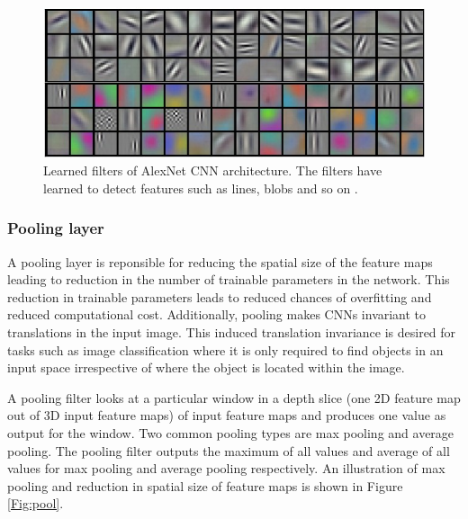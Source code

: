 	\begin{figure}[h]
		\centering
		\includegraphics[width=.8\linewidth]{images/conv_template}
		\caption{Learned filters of AlexNet CNN architecture. The filters have learned to detect features such as lines, blobs and so on \cite{cs231n}.}
		\label{Fig:conv_template}
	\end{figure}
	

\subsubsection{Pooling layer}

A pooling layer is reponsible for reducing the spatial size of the feature maps leading to reduction in the number of trainable parameters in the network. This reduction in trainable parameters leads to reduced chances of overfitting and reduced computational cost. Additionally, pooling makes CNNs invariant to translations in the input image. This induced translation invariance is desired for tasks such as image classification where it is only required to find objects in an input space irrespective of where the object is located within the image. 

A pooling filter looks at a particular window in a depth slice (one 2D feature map out of 3D input feature maps) of input feature maps and produces one value as output for the window. Two common pooling types are max pooling and average pooling. The pooling filter outputs the maximum of all values and average of all values for max pooling and average pooling respectively. An illustration of max pooling and reduction in spatial size of feature maps is shown in Figure \ref{Fig:pool}.

